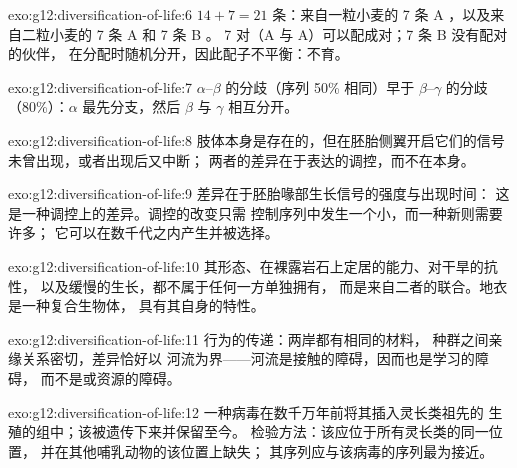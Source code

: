 \begin{solution}{exo:g12:diversification-of-life:6}
$14 + 7 = 21$ 条：来自一粒小麦的 7 条 A ，以及来自二粒小麦的 7 条 A 和 7 条 B 。
7 对（A 与 A）可以配成对；7 条 B 没有配对的伙伴，
在分配时随机分开，因此配子不平衡：不育。
\end{solution}

\begin{solution}{exo:g12:diversification-of-life:7}
$\alpha$--$\beta$ 的分歧（序列 50\% 相同）早于
$\beta$--$\gamma$ 的分歧（80\%）：$\alpha$ 最先分支，然后 $\beta$
与 $\gamma$ 相互分开。
\end{solution}

\begin{solution}{exo:g12:diversification-of-life:8}
肢体本身是存在的，但在胚胎侧翼开启它们的信号
未曾出现，或者出现后又中断；
两者的差异在于表达的调控，而不在本身。
\end{solution}

\begin{solution}{exo:g12:diversification-of-life:9}
差异在于胚胎喙部生长信号的强度与出现时间：
这是一种调控上的差异。调控的改变只需
控制序列中发生一个小，而一种新则需要许多；
它可以在数千代之内产生并被选择。
\end{solution}

\begin{solution}{exo:g12:diversification-of-life:10}
其形态、在裸露岩石上定居的能力、对干旱的抗性，
以及缓慢的生长，都不属于任何一方单独拥有，
而是来自二者的联合。地衣是一种复合生物体，
具有其自身的特性。
\end{solution}

\begin{solution}{exo:g12:diversification-of-life:11}
行为的传递：两岸都有相同的材料，
种群之间亲缘关系密切，差异恰好以
河流为界——河流是接触的障碍，因而也是学习的障碍，
而不是或资源的障碍。
\end{solution}

\begin{solution}{exo:g12:diversification-of-life:12}
一种病毒在数千万年前将其插入灵长类祖先的
生殖的组中；该被遗传下来并保留至今。
检验方法：该应位于所有灵长类的同一位置，
并在其他哺乳动物的该位置上缺失；
其序列应与该病毒的序列最为接近。
\end{solution}

